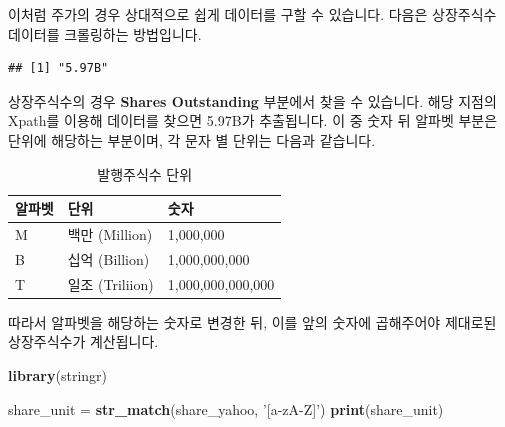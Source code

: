 \documentclass[]{book}
\newenvironment{Shaded}{\begin{snugshade}}{\end{snugshade}}
\newcommand{\DataTypeTok}[1]{\textcolor[rgb]{0.13,0.29,0.53}{#1}}
\newcommand{\KeywordTok}[1]{\textcolor[rgb]{0.13,0.29,0.53}{\textbf{#1}}}
\newcommand{\NormalTok}[1]{#1}
\newcommand{\OperatorTok}[1]{\textcolor[rgb]{0.81,0.36,0.00}{\textbf{#1}}}
\newcommand{\StringTok}[1]{\textcolor[rgb]{0.31,0.60,0.02}{#1}}
\begin{document}
이처럼 주가의 경우 상대적으로 쉽게 데이터를 구할 수 있습니다. 다음은 상장주식수 데이터를 크롤링하는 방법입니다.

\begin{Shaded}
\end{Shaded}

\begin{verbatim}
## [1] "5.97B"
\end{verbatim}

상장주식수의 경우 \textbf{Shares Outstanding} 부분에서 찾을 수 있습니다. 해당 지점의 Xpath를 이용해 데이터를 찾으면 5.97B가 추출됩니다. 이 중 숫자 뒤 알파벳 부분은 단위에 해당하는 부분이며, 각 문자 별 단위는 다음과 같습니다.

\begin{table}[t]

\caption{\label{tab:unnamed-chunk-37}발행주식수 단위}
\centering
\begin{tabular}{lll}
\toprule
알파벳 & 단위 & 숫자\\
\midrule
M & 백만 (Million) & 1,000,000\\
B & 십억 (Billion) & 1,000,000,000\\
T & 일조 (Triliion) & 1,000,000,000,000\\
\bottomrule
\end{tabular}
\end{table}

따라서 알파벳을 해당하는 숫자로 변경한 뒤, 이를 앞의 숫자에 곱해주어야 제대로된 상장주식수가 계산됩니다.

\begin{Shaded}
\begin{Highlighting}[]
\KeywordTok{library}\NormalTok{(stringr)}

\NormalTok{share_unit =}\StringTok{ }\KeywordTok{str_match}\NormalTok{(share_yahoo, }\StringTok{'[a-zA-Z]'}\NormalTok{)}
\KeywordTok{print}\NormalTok{(share_unit)}
\end{Highlighting}
\end{Shaded}
\end{document}
